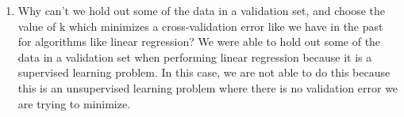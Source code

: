 \begin{enumerate}
\begin{figure}[H]
    	\label{fig:my_label}
    \end{figure}            
    \item Why can't we hold out some of the data in a validation set, and choose the value of k which minimizes a cross-validation error like we have in the past for algorithms like linear regression?
    \newline
    \newline
    We were able to hold out some of the data in a validation set when performing linear regression because it is a supervised learning problem. In this case, we are not able to do this because this is an unsupervised learning problem where there is no validation error we are trying to minimize.
\end{enumerate}
